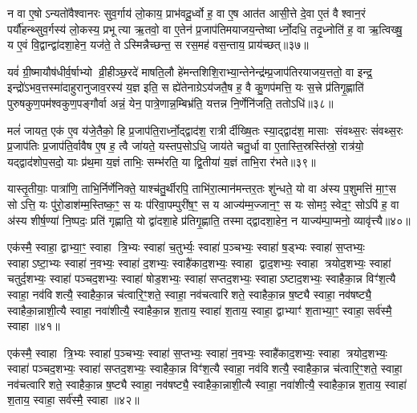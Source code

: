 न वा ए॒षोऽन्यतो॑वैश्वानरः सुव॒र्गाय॑ लो॒काय॒ प्राभ॑वदू॒र्ध्वो ह॒ वा ए॒ष आत॑त आसी॒त्ते दे॒वा ए॒तं वैश्वान॒रं पर्यौ॑हन्थ्सुव॒र्गस्य॑ लो॒कस्य॒ प्रभूत्या ऋ॒तवो॒ वा ए॒तेन॑ प्र॒जाप॑तिमयाजय॒न्तेष्वार्ध्नो॒दधि॒ तदृ॒ध्नोति॑ ह॒ वा ऋ॒त्विख्षु॒ य ए॒वं वि॒द्वान्द्वा॑दशा॒हेन॒ यज॑ते॒ तेऽस्मिन्नैच्छन्त॒ स रस॒मह॑ वस॒न्ताय॒ प्राय॑च्छत्॥३७॥

यवं॑ ग्री॒ष्मायौष॑धीर्व॒र्\mbox{}षाभ्यो व्री॒हीञ्छ॒रदे॑ माषति॒लौ हे॑मन्तशिशि॒राभ्या॒न्तेनेन्द्र॑म्प्र॒जाप॑तिरयाजय॒त्ततो॒ वा इन्द्र॒ इन्द्रो॑ऽभव॒त्तस्मा॑दाहुरानुजाव॒रस्य॑ य॒ज्ञ इति॒ स ह्ये॑तेनाग्रेऽय॑जतै॒ष ह॒ वै कु॒णप॑मत्ति॒ यः स॒त्त्रे प्र॑तिगृ॒ह्णाति॑ पुरुषकुण॒पम॑श्वकुण॒पङ्गौर्वा अन्नं॒ येन॒ पात्रे॒णान्न॒म्बिभ्र॑ति॒ यत्तन्न नि॒र्णेनि॑जति॒ ततोऽधि॑॥३८॥

मलं॑ जायत॒ एक॑ ए॒व य॑जे॒तैको॒ हि प्र॒जाप॑ति॒रार्ध्नो॒द्द्वाद॑श॒ रात्रीर्दीख्षि॒तः स्या॒द्द्वाद॑श॒ मासाः संवथ्स॒रः सं॑वथ्स॒रः प्र॒जाप॑तिः प्र॒जाप॑ति॒र्वावैष ए॒ष ह॒ त्वै जा॑यते॒ यस्तप॒सोऽधि॒ जाय॑ते चतु॒र्धा वा ए॒तास्ति॒स्रस्ति॑स्रो॒ रात्र॑यो॒ यद्द्वाद॑शोप॒सदो॒ याः प्र॑थ॒मा य॒ज्ञं ताभिः॒ सम्भ॑रति॒ या द्वि॒तीया॑ य॒ज्ञं ताभि॒रा र॑भते॥३९॥

यास्तृ॒तीयाः॒ पात्रा॑णि॒ ताभि॒र्निर्णे॑निक्ते॒ याश्च॑तु॒र्थीरपि॒ ताभि॑रा॒त्मान॑मन्तर॒तः शु॑न्धते॒ यो वा अ॑स्य प॒शुमत्ति॑ मा॒ꣳ॒स सोऽत्ति॒ यः पु॑रो॒डाश॑म्म॒स्तिष्क॒ꣳ॒ स यः प॑रिवा॒पम्पुरी॑ष॒ꣳ॒ स य आज्य॑म्म॒ज्जान॒ꣳ॒ स यः सोमꣵ॒ स्वेद॒ꣳ॒ सोऽपि॑ ह॒ वा अ॑स्य शीर्\mbox{}ष॒ण्या॑ नि॒ष्पदः॒ प्रति॑ गृह्णाति॒ यो द्वा॑दशा॒हे प्र॑तिगृ॒ह्णाति॒ तस्माद्द्वादशा॒हेन॒ न याज्य॑म्पा॒प्मनो॒ व्यावृ॑त्त्यै॥४०॥

{\anuvakamend[{अय॑च्छ॒दधि॑ रभते द्वादशा॒हेन॑ च॒त्वारि॑ च॥10॥}]}

एक॑स्मै॒ स्वाहा॒ द्वाभ्या॒ꣳ॒ स्वाहा त्रि॒भ्यः स्वाहा॑ च॒तुर्भ्यः॒ स्वाहा॑ प॒ञ्चभ्यः॒ स्वाहा॑ ष॒ड्भ्यः स्वाहा॑ स॒प्तभ्यः॒ स्वाहाऽष्टा॒भ्यः स्वाहा॑ न॒वभ्यः॒ स्वाहा॑ द॒शभ्यः॒ स्वाहै॑काद॒शभ्यः॒ स्वाहा द्वाद॒शभ्यः॒ स्वाहा त्रयोद॒शभ्यः॒ स्वाहा॑ चतुर्द॒शभ्यः॒ स्वाहा॑ पञ्चद॒शभ्यः॒ स्वाहा॑ षोड॒शभ्यः॒ स्वाहा॑ सप्तद॒शभ्यः॒ स्वाहाऽष्टाद॒शभ्यः॒ स्वाहैका॒न्न विꣳ॑श॒त्यै स्वाहा॒ नव॑विशत्यै॒ स्वाहैका॒न्न च॑त्वारि॒ꣳ॒शते॒ स्वाहा॒ नव॑चत्वारिशते॒ स्वाहैका॒न्न ष॒ष्ट्यै स्वाहा॒ नव॑षष्ट्यै॒ स्वाहैका॒न्नाशी॒त्यै स्वाहा॒ नवा॑शीत्यै॒ स्वाहैका॒न्न श॒ताय॒ स्वाहा॑ श॒ताय॒ स्वाहा॒ द्वाभ्याꣳ॑ श॒ताभ्या॒ꣳ॒ स्वाहा॒ सर्व॑स्मै॒ स्वाहा॥४१॥

{\anuvakamend[{नव॑चत्वारिशते॒ स्वाहैका॒न्नैक॑विशतिश्च॥11॥}]}

एक॑स्मै॒ स्वाहा त्रि॒भ्यः स्वाहा॑ प॒ञ्चभ्यः॒ स्वाहा॑ स॒प्तभ्यः॒ स्वाहा॑ न॒वभ्यः॒ स्वाहै॑काद॒शभ्यः॒ स्वाहा त्रयोद॒शभ्यः॒ स्वाहा॑ पञ्चद॒शभ्यः॒ स्वाहा॑ सप्तद॒शभ्यः॒ स्वाहैका॒न्न विꣳ॑श॒त्यै स्वाहा॒ नव॑विशत्यै॒ स्वाहैका॒न्न च॑त्वारि॒ꣳ॒शते॒ स्वाहा॒ नव॑चत्वारिशते॒ स्वाहैका॒न्न ष॒ष्ट्यै स्वाहा॒ नव॑षष्ट्यै॒ स्वाहैका॒न्नाशी॒त्यै स्वाहा॒ नवा॑शीत्यै॒ स्वाहैका॒न्न श॒ताय॒ स्वाहा॑ श॒ताय॒ स्वाहा॒ सर्व॑स्मै॒ स्वाहा॥४२॥

